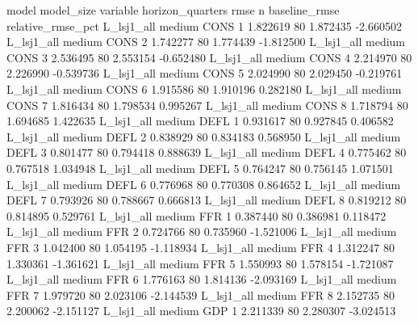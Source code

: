         model model_size variable  horizon_quarters      rmse  n  baseline_rmse  relative_rmse_pct
    L_lsj1_all     medium     CONS                 1  1.822619 80       1.872435          -2.660502
    L_lsj1_all     medium     CONS                 2  1.742277 80       1.774439          -1.812500
    L_lsj1_all     medium     CONS                 3  2.536495 80       2.553154          -0.652480
    L_lsj1_all     medium     CONS                 4  2.214970 80       2.226990          -0.539736
    L_lsj1_all     medium     CONS                 5  2.024990 80       2.029450          -0.219761
    L_lsj1_all     medium     CONS                 6  1.915586 80       1.910196           0.282180
    L_lsj1_all     medium     CONS                 7  1.816434 80       1.798534           0.995267
    L_lsj1_all     medium     CONS                 8  1.718794 80       1.694685           1.422635
    L_lsj1_all     medium     DEFL                 1  0.931617 80       0.927845           0.406582
    L_lsj1_all     medium     DEFL                 2  0.838929 80       0.834183           0.568950
    L_lsj1_all     medium     DEFL                 3  0.801477 80       0.794418           0.888639
    L_lsj1_all     medium     DEFL                 4  0.775462 80       0.767518           1.034948
    L_lsj1_all     medium     DEFL                 5  0.764247 80       0.756145           1.071501
    L_lsj1_all     medium     DEFL                 6  0.776968 80       0.770308           0.864652
    L_lsj1_all     medium     DEFL                 7  0.793926 80       0.788667           0.666813
    L_lsj1_all     medium     DEFL                 8  0.819212 80       0.814895           0.529761
    L_lsj1_all     medium      FFR                 1  0.387440 80       0.386981           0.118472
    L_lsj1_all     medium      FFR                 2  0.724766 80       0.735960          -1.521006
    L_lsj1_all     medium      FFR                 3  1.042400 80       1.054195          -1.118934
    L_lsj1_all     medium      FFR                 4  1.312247 80       1.330361          -1.361621
    L_lsj1_all     medium      FFR                 5  1.550993 80       1.578154          -1.721087
    L_lsj1_all     medium      FFR                 6  1.776163 80       1.814136          -2.093169
    L_lsj1_all     medium      FFR                 7  1.979720 80       2.023106          -2.144539
    L_lsj1_all     medium      FFR                 8  2.152735 80       2.200062          -2.151127
    L_lsj1_all     medium      GDP                 1  2.211339 80       2.280307          -3.024513
